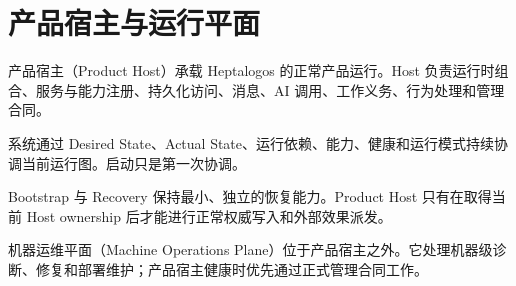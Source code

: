 \chapter{产品宿主与运行平面}

产品宿主（Product Host）承载 Heptalogos 的正常产品运行。Host 负责运行时组合、服务与能力注册、持久化访问、消息、AI 调用、工作义务、行为处理和管理合同。

系统通过 Desired State、Actual State、运行依赖、能力、健康和运行模式持续协调当前运行图。启动只是第一次协调。

Bootstrap 与 Recovery 保持最小、独立的恢复能力。Product Host 只有在取得当前 Host ownership 后才能进行正常权威写入和外部效果派发。

机器运维平面（Machine Operations Plane）位于产品宿主之外。它处理机器级诊断、修复和部署维护；产品宿主健康时优先通过正式管理合同工作。

